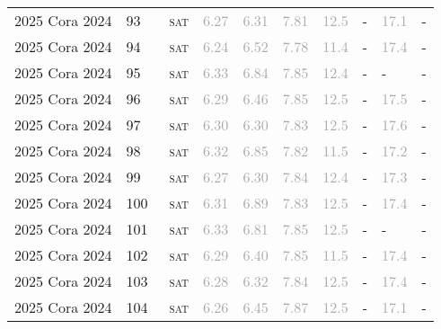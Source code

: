 \begin{center}
{\begin{longtable}{@{}llllllllll@{}}
2025 Cora 2024 & 93 & ~\textsc{sat} & \textcolor{darkgray}{6.27} & \textcolor{darkgray}{6.31} & \textcolor{darkgray}{7.81} & \textcolor{darkgray}{12.5} & - & \textcolor{darkgray}{17.1} & - \\
2025 Cora 2024 & 94 & ~\textsc{sat} & \textcolor{darkgray}{6.24} & \textcolor{darkgray}{6.52} & \textcolor{darkgray}{7.78} & \textcolor{darkgray}{11.4} & - & \textcolor{darkgray}{17.4} & - \\
2025 Cora 2024 & 95 & ~\textsc{sat} & \textcolor{darkgray}{6.33} & \textcolor{darkgray}{6.84} & \textcolor{darkgray}{7.85} & \textcolor{darkgray}{12.4} & - & - & - \\
2025 Cora 2024 & 96 & ~\textsc{sat} & \textcolor{darkgray}{6.29} & \textcolor{darkgray}{6.46} & \textcolor{darkgray}{7.85} & \textcolor{darkgray}{12.5} & - & \textcolor{darkgray}{17.5} & - \\
2025 Cora 2024 & 97 & ~\textsc{sat} & \textcolor{darkgray}{6.30} & \textcolor{darkgray}{6.30} & \textcolor{darkgray}{7.83} & \textcolor{darkgray}{12.5} & - & \textcolor{darkgray}{17.6} & - \\
2025 Cora 2024 & 98 & ~\textsc{sat} & \textcolor{darkgray}{6.32} & \textcolor{darkgray}{6.85} & \textcolor{darkgray}{7.82} & \textcolor{darkgray}{11.5} & - & \textcolor{darkgray}{17.2} & - \\
2025 Cora 2024 & 99 & ~\textsc{sat} & \textcolor{darkgray}{6.27} & \textcolor{darkgray}{6.30} & \textcolor{darkgray}{7.84} & \textcolor{darkgray}{12.4} & - & \textcolor{darkgray}{17.3} & - \\
2025 Cora 2024 & 100 & ~\textsc{sat} & \textcolor{darkgray}{6.31} & \textcolor{darkgray}{6.89} & \textcolor{darkgray}{7.83} & \textcolor{darkgray}{12.5} & - & \textcolor{darkgray}{17.4} & - \\
2025 Cora 2024 & 101 & ~\textsc{sat} & \textcolor{darkgray}{6.33} & \textcolor{darkgray}{6.81} & \textcolor{darkgray}{7.85} & \textcolor{darkgray}{12.5} & - & - & - \\
2025 Cora 2024 & 102 & ~\textsc{sat} & \textcolor{darkgray}{6.29} & \textcolor{darkgray}{6.40} & \textcolor{darkgray}{7.85} & \textcolor{darkgray}{11.5} & - & \textcolor{darkgray}{17.4} & - \\
2025 Cora 2024 & 103 & ~\textsc{sat} & \textcolor{darkgray}{6.28} & \textcolor{darkgray}{6.32} & \textcolor{darkgray}{7.84} & \textcolor{darkgray}{12.5} & - & \textcolor{darkgray}{17.4} & - \\
2025 Cora 2024 & 104 & ~\textsc{sat} & \textcolor{darkgray}{6.26} & \textcolor{darkgray}{6.45} & \textcolor{darkgray}{7.87} & \textcolor{darkgray}{12.5} & - & \textcolor{darkgray}{17.1} & - \\

\end{longtable}}
\end{center}

